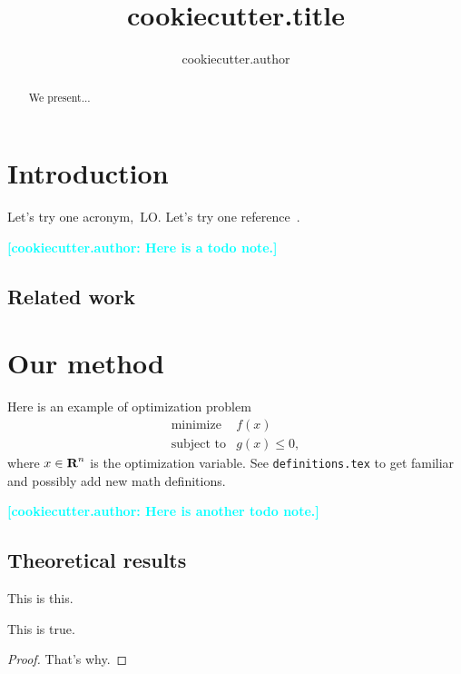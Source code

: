 \documentclass[12pt]{article}
\title{ {{cookiecutter.title}} }
\author{ {{cookiecutter.author}} }
\newcommand{\mynote}[1]{}
\renewcommand{\mynote}[1]{\textcolor{cyan}{\textbf{[{{cookiecutter.author}}: #1]}}}
\begin{document}
\maketitle

\begin{abstract}
We present...
\end{abstract}



\section{Introduction}

Let's try one acronym,~\gls{LO}. Let's try one reference~\cite{conforti2014}.

\mynote{Here is a todo note.}


\subsection{Related work}

\section{Our method}

Here is an example of optimization problem
\begin{equation*}
	\begin{array}{ll}
		\text{minimize} & f(x)\\
		\text{subject to} & g(x)\le 0,
	\end{array}
\end{equation*}
where $x \in {\mbox{\bf R}}^n$ is the optimization variable.
See {\tt definitions.tex} to get familiar and possibly add new math definitions.


\mynote{Here is another todo note.}

\subsection{Theoretical results}%
\label{sub:theoretical_results}


\begin{definition}
	This is this.
\end{definition}


\begin{theorem}
	This is true.
\end{theorem}
\begin{proof}
	That's why.
\end{proof}
\end{document}
